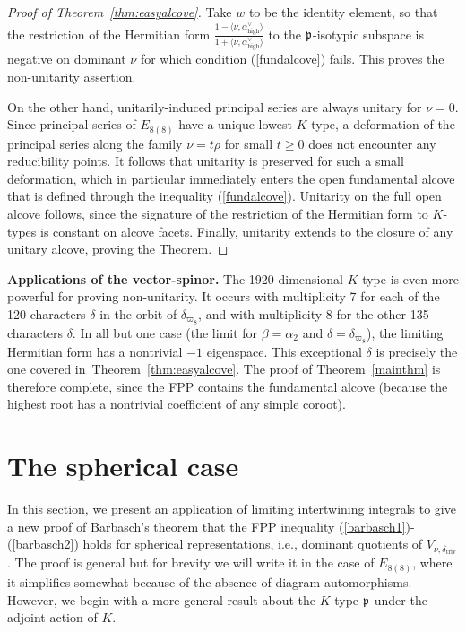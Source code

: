 \documentclass[12pt]{article}
\newcommand{\thmref}[1]{Theorem~\ref{#1}}
\numberwithin{equation}{section}
\renewcommand\a{\alpha}
\renewcommand\d{\delta}
\renewcommand\({\left(}
\renewcommand\){\right)}
\begin{document}
\begin{proof}[Proof of \thmref{thm:easyalcove}]
Take $w$ to be the identity element, so that the restriction of the Hermitian form $\frac{1-\langle \nu,\a_\text{high}^\vee\rangle}{1+\langle \nu,\a_\text{high}^\vee\rangle}$ to  the $\frak p$-isotypic subspace is negative on dominant $\nu$ for which condition (\ref{fundalcove}) fails.  This proves the non-unitarity assertion.

On the other hand, unitarily-induced principal series are always unitary for $\nu=0$.  Since principal series of $E_{8(8)}$ have a unique lowest $K$-type, a deformation of the principal series along the family $\nu=t\rho$ for small $t\ge 0$ does not encounter any reducibility points.  It follows that unitarity is preserved for such a small deformation, which in particular immediately enters the open fundamental alcove that is defined through the inequality (\ref{fundalcove}).  Unitarity on the full open  alcove follows, since the signature of the restriction of the Hermitian form to $K$-types is constant on alcove facets.  Finally, unitarity extends to the closure of any unitary alcove, proving the Theorem.
\end{proof}

{\bf Applications of the vector-spinor.}  The 1920-dimensional $K$-type is even more powerful for proving non-unitarity.  It occurs with multiplicity 7 for each of the 120 characters $\delta$ in the orbit of $\d_{\varpi_8}$, and with multiplicity 8 for the other 135 characters $\d$.  In all but one case (the limit for $\beta=\alpha_2$ and $\delta=\d_{\varpi_8}$), the limiting Hermitian form has a nontrivial $-1$ eigenspace.  This exceptional $\d$ is precisely the one covered in~\thmref{thm:easyalcove}.  The proof of Theorem~\ref{mainthm} is therefore complete, since the FPP contains the fundamental alcove (because the highest root has a nontrivial coefficient of any simple coroot).


\section{The spherical case}\label{sec:spherical}



In this section, we present an application of limiting  intertwining integrals to give a new proof of Barbasch's theorem that the FPP inequality (\ref{barbasch1})-(\ref{barbasch2}) holds for spherical representations, i.e., dominant quotients of $V_{\nu,\delta_\text{triv}}$.  The proof is general but for brevity we will write it in the case of $E_{8(8)}$, where it simplifies somewhat because of the absence of diagram automorphisms.  However, we begin with a more general result about the $K$-type $\frak p$ under the adjoint action of $K$.
\end{document}
